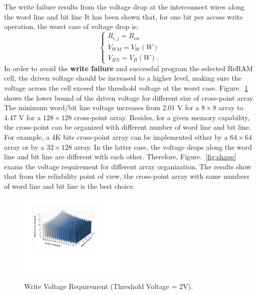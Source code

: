 The write failure results from the voltage drop at the interconnect wires
along the word line and bit line It has been shown that, for one bit per
access write operation, the worst case of voltage drop is:
\begin{equation}
\left\{
\begin{array}{l}
R_{i,j}=R_{on}\\
V_{WM}=V_W(W)\\
V_{BN}=V_B(W).
\end{array} \right.
\end{equation}
In order to avoid the \textbf{write failure} and successful program the
selected ReRAM cell, the driven voltage should be increased to a higher
level, making sure the voltage across the cell exceed the threshold
voltage at the worst case. Figure.~\ref{fig:worst_v} shows the lower bound
of the driven voltage for different size of cross-point array. The minimum
word/bit line voltage increases from 2.01 V for a $8 \times 8$ array to
4.47 V for a $128 \times 128$ cross-point array. Besides, for a given
memory capability, the cross-point can be organized with different number
of word line and bit line. For example, a 4K bits cross-point array can be
implemented either by a $64 \times 64$ array or by a $32 \times 128$
array. In the latter case, the voltage drops along the word line and bit
line are different with each other. Therefore, Figure.~\ref{fig:shape}
exams the voltage requirement for different array organization. The
results show that from the reliability point of view, the cross-point
array with same numbers of word line and bit line is the best choice.


\begin{figure}%
\centering
  \includegraphics[width=0.45\textwidth]{./figures/worst_v2.pdf}\\
  \caption{Write Voltage Requirement (Threshold Voltage = 2V). }\label{fig:worst_v}
\end{figure}


